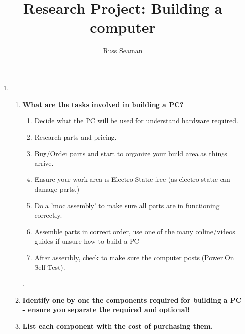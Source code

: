 \documentclass[]{article}
\title{Research Project: Building a computer}
\author{Russ Seaman}
\begin{document}
\maketitle

\begin{enumerate}
	\item 

\begin{enumerate}
	\item \textbf{What are the tasks involved in building a PC?}
				\smallskip
				\\ \begin{enumerate}
					\item Decide what the PC will be used for understand hardware required.
					\item Research parts and pricing.
					\item Buy/Order parts and start to organize your build area as things arrive.
					\item Ensure your work area is Electro-Static free (as electro-static can damage parts.)
					\item Do a 'moc assembly' to make sure all parts are in functioning correctly.
					\item Assemble parts in correct order, use one of the many online/videos guides if unsure how to build a PC
					\item After assembly, check to make sure the computer posts (Power On Self Test).
		
				\end{enumerate}.
				\medskip
	\item \textbf{Identify one by one the components required for building a PC - ensure you separate the required and optional!}
				\smallskip
				\begin{enumerate}
				\end{enumerate}		
				\medskip
				
	\item \textbf{List each component with the cost of purchasing them.}
				\smallskip


\end{enumerate}
\end{enumerate}
\end{document}
